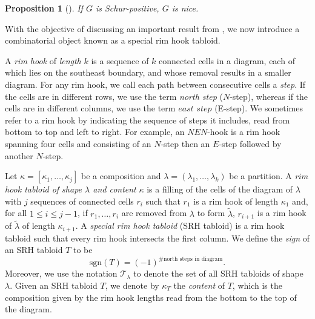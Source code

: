\documentclass[12pt]{amsart}
\numberwithin{equation}{section}
\theoremstyle{plain}
\newtheorem{proposition}[equation]{Proposition}
\theoremstyle{definition}
\theoremstyle{remark}
\begin{document}
\begin{proposition}[\cite{stan_98}]
\label{prop:schur_pos_means_nice}
If $G$ is Schur-positive, $G$ is nice.
\end{proposition}

With the objective of discussing an important result from \cite{WW2020}, we now introduce a combinatorial object known as a special rim hook tabloid. 
 
 
 A \textit{rim hook} of \textit{length} $k$ is a sequence of $k$ connected cells in a diagram, each of which lies on the southeast boundary, and whose removal results in a smaller diagram. For any rim hook, we call each path between consecutive cells a \textit{step}. If the cells are in different rows, we use the term \textit{north step} ($N$-step), whereas if the cells are in different columns, we use the term $\textit{east step}$ (E-step). We sometimes refer to a rim hook by indicating the sequence of steps it includes, read from bottom to top and left to right. For example, an $NEN$-hook is a rim hook spanning four cells and consisting of an $N$-step then an $E$-step followed by another $N$-step.
 
 
 
 Let $\kappa=[\kappa_1,\dots,\kappa_{j}]$ be a composition and $\lambda=(\lambda_1,\dots,\lambda_k)$ be a partition. A \textit{rim hook tabloid of shape $\lambda$ and content} $\kappa$ is a filling of the cells of the diagram of $\lambda$ with $j$ sequences of connected cells $r_i$ such that $r_1$ is a rim hook of length $\kappa_1$ and, for all $1\le i \le j-1$, if $r_1,\dots, r_i$ are removed from $\lambda$ to form $\tilde{\lambda}$, $r_{i+1}$ is a rim hook of $\tilde{\lambda}$ of length $\kappa_{i+1}$.  A \textit{special rim hook tabloid} (SRH tabloid) is a rim hook tabloid such that every rim hook intersects the first column. We define the \textit{sign} of an SRH tabloid $T$ to be
 \[
 \mathrm{sgn}(T)=(-1)^{\text{\# north steps in diagram}}.
 \]
 Moreover, we use the notation $\mathcal{T}_{\lambda}$ to denote the set of all SRH tabloids of shape $\lambda$. Given an SRH tabloid $T$, we denote by $\kappa_T$ the \textit{content} of $T$, which is the composition given by the rim hook lengths read from the bottom to the top of the diagram.
\end{document}
